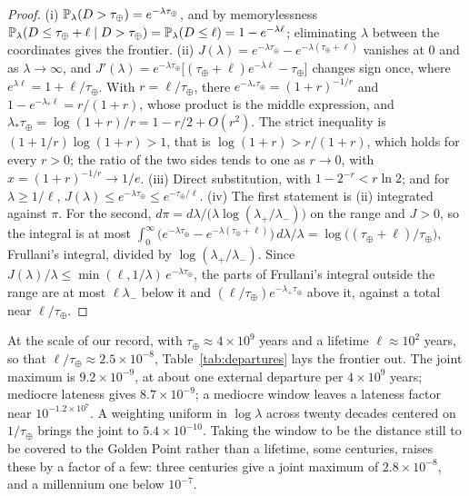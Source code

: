 \begin{proof}
(i) $\mathbb{P}_\lambda(D>\tau_\oplus)=e^{-\lambda\tau_\oplus}$, and by
memorylessness $\mathbb{P}_\lambda(D\le\tau_\oplus+\ell\mid D>\tau_\oplus)
=\mathbb{P}_\lambda(D\le\ell)=1-e^{-\lambda\ell}$; eliminating $\lambda$
between the coordinates gives the frontier. (ii)
$J(\lambda)=e^{-\lambda\tau_\oplus}-e^{-\lambda(\tau_\oplus+\ell)}$
vanishes at $0$ and as $\lambda\to\infty$, and
$J'(\lambda)=e^{-\lambda\tau_\oplus}\bigl[(\tau_\oplus+\ell)e^{-\lambda\ell}
-\tau_\oplus\bigr]$ changes sign once, where
$e^{\lambda\ell}=1+\ell/\tau_\oplus$. With $r=\ell/\tau_\oplus$, there
$e^{-\lambda_\ast\tau_\oplus}=(1+r)^{-1/r}$ and
$1-e^{-\lambda_\ast\ell}=r/(1+r)$, whose product is the middle
expression, and $\lambda_\ast\tau_\oplus=\log(1+r)/r=1-r/2+O(r^2)$. The
strict inequality is $(1+1/r)\log(1+r)>1$, that is
$\log(1+r)>r/(1+r)$, which holds for every $r>0$; the ratio of the two
sides tends to one as $r\to0$, with $x=(1+r)^{-1/r}\to1/e$. (iii)
Direct substitution, with $1-2^{-r}<r\ln2$; and for $\lambda\ge1/\ell$,
$J(\lambda)\le e^{-\lambda\tau_\oplus}\le e^{-\tau_\oplus/\ell}$. (iv)
The first statement is (ii) integrated against $\pi$. For the second,
$d\pi=d\lambda/\bigl(\lambda\log(\lambda_+/\lambda_-)\bigr)$ on the
range and $J>0$, so the integral is at most
$\int_0^\infty\bigl(e^{-\lambda\tau_\oplus}-e^{-\lambda(\tau_\oplus+\ell)}\bigr)
\,d\lambda/\lambda=\log\bigl((\tau_\oplus+\ell)/\tau_\oplus\bigr)$,
Frullani's integral, divided by $\log(\lambda_+/\lambda_-)$. Since
$J(\lambda)/\lambda\le\min(\ell,1/\lambda)\,e^{-\lambda\tau_\oplus}$, the
parts of Frullani's integral outside the range are at most
$\ell\lambda_-$ below it and $(\ell/\tau_\oplus)e^{-\lambda_+\tau_\oplus}$
above it, against a total near $\ell/\tau_\oplus$.
\end{proof}

At the scale of our record, with $\tau_\oplus\approx4\times10^{9}$ years
and a lifetime $\ell\approx10^{2}$ years, so that
$\ell/\tau_\oplus\approx2.5\times10^{-8}$, Table~\ref{tab:departures}
lays the frontier out. The joint maximum is $9.2\times10^{-9}$, at about
one external departure per $4\times10^{9}$ years; mediocre lateness gives
$8.7\times10^{-9}$; a mediocre window leaves a lateness factor near
$10^{-1.2\times10^{7}}$. A weighting uniform in $\log\lambda$ across
twenty decades centered on $1/\tau_\oplus$ brings the joint to
$5.4\times10^{-10}$. Taking the window to be the distance still to be
covered to the Golden Point rather than a lifetime, some centuries,
raises these by a factor of a few: three centuries give a joint maximum
of $2.8\times10^{-8}$, and a millennium one below $10^{-7}$.

